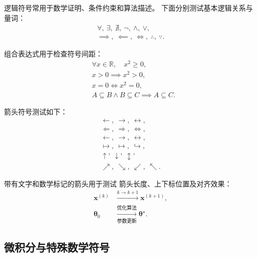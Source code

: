 逻辑符号常用于数学证明、条件约束和算法描述。
下面分别测试基本逻辑关系与量词：
\begin{equation}
  \label{eq:test-symbol-logic}
  \begin{gathered}
    \forall,\ \exists,\ \nexists,\ \neg,\ 
    \land,\ \lor,\\
    \implies,\ \impliedby,\ \iff,\ 
    \therefore,\ \because.
  \end{gathered}
\end{equation}

组合表达式用于检查符号间距：
\begin{equation}
  \label{eq:test-symbol-logic-expression}
  \begin{aligned}
    &\forall x\in\mathbb{R},\quad x^2\ge 0,\\
    &x>0\implies x^2>0,\\
    &x=0\iff x^2=0,\\
    &A\subseteq B\land B\subseteq C
      \implies A\subseteq C.
  \end{aligned}
\end{equation}

箭头符号测试如下：
\begin{equation}
  \label{eq:test-symbol-arrows}
  \begin{gathered}
    \leftarrow,\ \rightarrow,\ \leftrightarrow,\\
    \Leftarrow,\ \Rightarrow,\ \Leftrightarrow,\\
    \longleftarrow,\ \longrightarrow,\ \longleftrightarrow,\\
    \mapsto,\ \longmapsto,\ \hookrightarrow,\\
    \uparrow,\ \downarrow,\ \updownarrow,\\
    \nearrow,\ \searrow,\ \swarrow,\ \nwarrow.
  \end{gathered}
\end{equation}

带有文字和数学标记的箭头用于测试
箭头长度、上下标位置及对齐效果：
\begin{equation}
  \label{eq:test-symbol-arrow-label}
  \begin{aligned}
    \boldsymbol{x}^{(k)}
      &\xrightarrow{k\to k+1}
       \boldsymbol{x}^{(k+1)},\\
    \boldsymbol{\theta}_0
      &\xrightarrow[\text{参数更新}]{\text{优化算法}}
       \boldsymbol{\theta}^{\star}.
  \end{aligned}
\end{equation}

\subsection{微积分与特殊数学符号}
\label{subsec:symbol-calculus}

